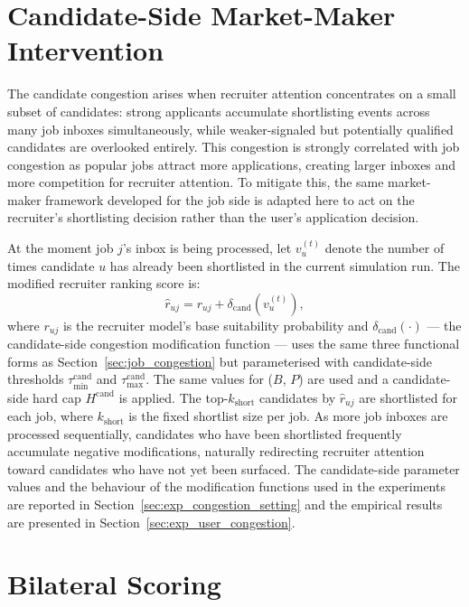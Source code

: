\section{Candidate-Side Market-Maker Intervention}
\label{sec:user_congestion}

The candidate congestion arises when recruiter attention concentrates on a small
subset of candidates: strong applicants accumulate shortlisting events across
many job inboxes simultaneously, while weaker-signaled but potentially
qualified candidates are overlooked entirely. This congestion is strongly correlated with job congestion as popular jobs attract more applications, creating larger inboxes and more competition for recruiter attention. To mitigate this, the same market-maker framework
developed for the job side is adapted here to act on the recruiter's shortlisting decision rather than the user's application decision.

At the moment job $j$'s inbox is being processed, let $v_u^{(t)}$ denote the
number of times candidate $u$ has already been shortlisted in the current
simulation run. The modified recruiter ranking score is:
\begin{equation}
    \hat{r}_{uj} = r_{uj} + \delta_{\text{cand}}\!\left(v_u^{(t)}\right),
\end{equation}
where $r_{uj}$ is the recruiter model's base suitability probability and
$\delta_{\text{cand}}(\cdot)$ --- the candidate-side congestion modification function --- uses the same three functional forms as
Section~\ref{sec:job_congestion} but parameterised with candidate-side
thresholds $\tau_{\min}^{\text{cand}}$ and $\tau_{\max}^{\text{cand}}$. The same values for ($B$, $P$) are used and a candidate-side hard cap $H^{\text{cand}}$ is applied. The top-$k_{\text{short}}$ candidates by $\hat{r}_{uj}$ are shortlisted for each job,
where $k_{\text{short}}$ is the fixed shortlist size per job. As more
job inboxes are processed sequentially, candidates who have been shortlisted
frequently accumulate negative modifications, naturally redirecting recruiter
attention toward candidates who have not yet been surfaced. The candidate-side
parameter values and the behaviour of the modification functions used in the experiments are reported in
Section~\ref{sec:exp_congestion_setting} and the empirical results are presented in Section~\ref{sec:exp_user_congestion}.

\section{Bilateral Scoring}
\label{sec:bilateral_scoring}

